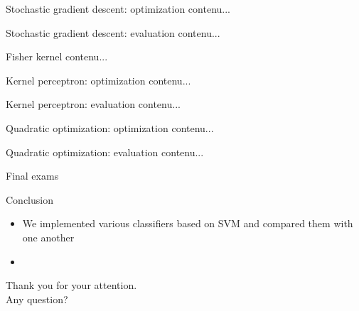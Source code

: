 \documentclass[10pt]{beamer}
\begin{document}
\begin{frame}{Stochastic gradient descent: optimization}
contenu...
\end{frame}

\begin{frame}{Stochastic gradient descent: evaluation}
contenu...
\end{frame}

\begin{frame}{Fisher kernel}
contenu...
\end{frame}

\begin{frame}{Kernel perceptron: optimization}
contenu...
\end{frame}

\begin{frame}{Kernel perceptron: evaluation}
contenu...
\end{frame}

\begin{frame}{Quadratic optimization: optimization}
contenu...
\end{frame}

\begin{frame}{Quadratic optimization: evaluation}
contenu...
\end{frame}

\begin{frame}{Final exams}

\end{frame}

\begin{frame}{Conclusion}
  \begin{itemize}
    \item We implemented various classifiers based on SVM and compared them with one another
    \item
  \end{itemize}
\end{frame}

\begin{frame}
\fontsize{15}{17}\selectfont
\begin{center}
Thank you for your attention. \\
\vspace{.4in}
Any question?
\end{center}
\end{frame}
\end{document}
